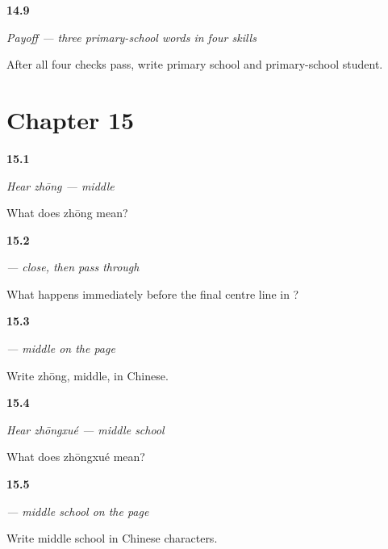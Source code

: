 \noindent\begin{minipage}[t]{\linewidth}
\raggedright
\hypertarget{review-ZH-C14-practice-primary-payoff}{\textbf{14.9}} \emph{Payoff — three primary-school words in four skills}\par
\small After all four checks pass, write primary school and primary-school student.
\end{minipage}\par\medskip

\section*{Chapter 15}

\noindent\begin{minipage}[t]{\linewidth}
\raggedright
\hypertarget{review-ZH-C15-hear-zhong-meaning}{\textbf{15.1}} \emph{Hear \emph{zhōng} — middle}\par
\small What does zhōng mean?
\end{minipage}\par\medskip

\noindent\begin{minipage}[t]{\linewidth}
\raggedright
\hypertarget{review-ZH-W15-zhong-order}{\textbf{15.2}} \emph{ — close, then pass through}\par
\small What happens immediately before the final centre line in ?
\end{minipage}\par\medskip

\noindent\begin{minipage}[t]{\linewidth}
\raggedright
\hypertarget{review-ZH-C15-zhong-write}{\textbf{15.3}} \emph{ — middle on the page}\par
\small Write zhōng, middle, in Chinese.
\end{minipage}\par\medskip

\noindent\begin{minipage}[t]{\linewidth}
\raggedright
\hypertarget{review-ZH-C15-hear-zhongxue-meaning}{\textbf{15.4}} \emph{Hear \emph{zhōngxué} — middle school}\par
\small What does zhōngxué mean?
\end{minipage}\par\medskip

\noindent\begin{minipage}[t]{\linewidth}
\raggedright
\hypertarget{review-ZH-C15-zhongxue-write}{\textbf{15.5}} \emph{ — middle school on the page}\par
\small Write middle school in Chinese characters.
\end{minipage}\par\medskip

